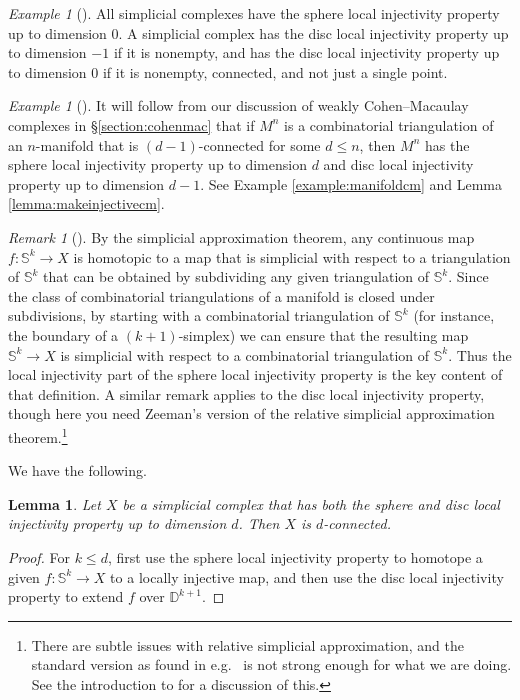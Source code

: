 \documentclass[11pt]{amsart}
\numberwithin{equation}{section}
\theoremstyle{plain}
\newtheorem{lemma}[theorem]{Lemma}
\theoremstyle{definition}
\theoremstyle{remark}
\newtheorem{rmk}[theorem]{Remark}
\newenvironment{remark}[1][]{\begin{rmk}[#1] \pushQED{\qed}}{\popQED \end{rmk}}
\newtheorem{eg}[theorem]{Example}
\newenvironment{example}[1][]{\begin{eg}[#1] \pushQED{\qed}}{\popQED \end{eg}}
\newcommand\bbD{\ensuremath{\mathbb{D}}}
\newcommand\bbS{\ensuremath{\mathbb{S}}}
\begin{document}
\begin{example}
\label{example:edgecases}
All simplicial complexes have the sphere local injectivity property up to dimension $0$.
A simplicial complex has the disc local injectivity property up to dimension $-1$ if it is nonempty,
and has the disc local injectivity property up to dimension $0$ if it is nonempty, connected, and not
just a single point.
\end{example}

\begin{example}
It will follow from our discussion of weakly Cohen--Macaulay complexes in \S \ref{section:cohenmac}
that if $M^n$ is a combinatorial triangulation of an $n$-manifold that is $(d-1)$-connected for some $d \leq n$, then $M^n$
has the sphere local injectivity property up to dimension $d$ and disc local injectivity property 
up to dimension $d-1$.  See Example \ref{example:manifoldcm} and Lemma \ref{lemma:makeinjectivecm}.
\end{example}

\begin{remark}
\label{remark:ADD1}
By the simplicial approximation theorem, any continuous map $f\colon \bbS^k \rightarrow X$ is
homotopic to a map that is simplicial with respect to a triangulation of $\bbS^k$ that
can be obtained by subdividing any given triangulation of $\bbS^k$.  Since the class
of combinatorial triangulations of a manifold is closed under subdivisions, by starting with
a combinatorial triangulation of $\bbS^k$ (for instance, the boundary of a $(k+1)$-simplex)
we can ensure that the resulting map $\bbS^k \rightarrow X$ is simplicial with respect to
a combinatorial triangulation of $\bbS^k$.  Thus the local injectivity part of the sphere
local injectivity property is the key content of that definition.  A similar remark applies
to the disc local injectivity property, though here you need Zeeman's version \cite{ZeemanRelative} of the
relative simplicial approximation theorem.\footnote{There are subtle issues with relative
simplicial approximation, and the standard version as found in e.g.\ \cite[Theorem 3.4.8]{Spanier}
is not strong enough for what we are doing.  See the introduction to \cite{ZeemanRelative}
for a discussion of this.}
\end{remark}

We have the following.

\begin{lemma}
\label{lemma:localinjcon}
Let $X$ be a simplicial complex that has both the sphere and disc local injectivity property
up to dimension $d$.  Then $X$ is $d$-connected.
\end{lemma}
\begin{proof}
For $k \leq d$, first use the sphere local injectivity property to homotope a given
$f\colon \bbS^k \rightarrow X$ to a locally injective map, and then use the disc local injectivity
property to extend $f$ over $\bbD^{k+1}$.
\end{proof}
\end{document}
